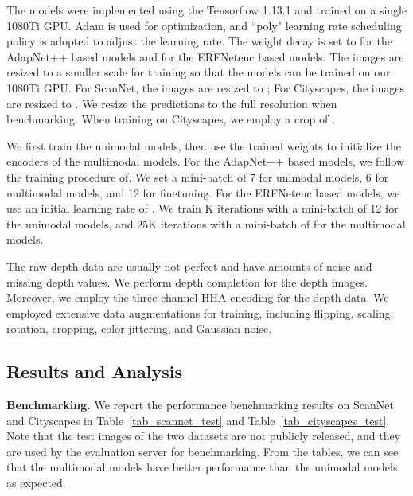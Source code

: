 \documentclass[letterpaper, 10 pt, conference]{ieeeconf}
\begin{document}
	The models were implemented using the Tensorflow 1.13.1 and trained on a single 1080Ti GPU. Adam is used for optimization, and ``poly" learning rate scheduling policy is adopted to adjust the learning rate. The weight decay is set to  for the AdapNet++ based models and  for the ERFNetenc based models. The images are resized to a smaller scale for training so that the models can be trained on our 1080Ti GPU. For ScanNet, the images are resized to ; For Cityscapes, the images are resized to . We resize the predictions to the full resolution when benchmarking. When training on Cityscapes, we employ a crop of . 
	
	We first train the unimodal models, then use the trained weights to initialize the encoders of the multimodal models.
	For the AdapNet++ based models, we follow the training procedure of\cite{valada2019self}. We set a mini-batch of 7 for unimodal models, 6 for multimodal models, and 12 for finetuning.
	For the ERFNetenc based models, we use an initial learning rate of . We train K iterations with a mini-batch of 12 for the unimodal models, and 25K iterations with a mini-batch of  for the multimodal models. 
	
	The raw depth data are usually not perfect and have amounts of noise and missing depth values. We perform depth completion\cite{ku2018defense} for the depth images. Moreover, we employ the three-channel HHA encoding\cite{gupta2014learning} for the depth data.
	We employed extensive data augmentations for training, including flipping, scaling, rotation, cropping, color jittering, and Gaussian noise.
	
	\subsection{Results and Analysis}
	\textbf{Benchmarking.} We report the performance benchmarking results on ScanNet and Cityscapes in Table~\ref{tab_scannet_test} and Table~\ref{tab_cityscapes_test}. Note that the test images of the two datasets are not publicly released, and they are used by the evaluation server for benchmarking. From the tables, we can see that the multimodal models have better performance than the unimodal models as expected.
	
\end{document}
